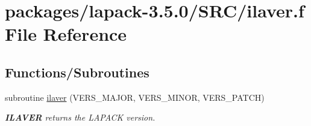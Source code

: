 \hypertarget{SRC_2ilaver_8f}{}\section{packages/lapack-\/3.5.0/\+S\+R\+C/ilaver.f File Reference}
\label{SRC_2ilaver_8f}
\subsection*{Functions/\+Subroutines}
\begin{DoxyCompactItemize}
\item 
subroutine \hyperlink{group__auxOTHERauxiliary_gace0eea943fa875e927d0b8b6614c9763}{ilaver} (V\+E\+R\+S\+\_\+\+M\+A\+J\+O\+R, V\+E\+R\+S\+\_\+\+M\+I\+N\+O\+R, V\+E\+R\+S\+\_\+\+P\+A\+T\+C\+H)
\begin{DoxyCompactList}\small\item\em {\bfseries I\+L\+A\+V\+E\+R} returns the L\+A\+P\+A\+C\+K version. \end{DoxyCompactList}\end{DoxyCompactItemize}
